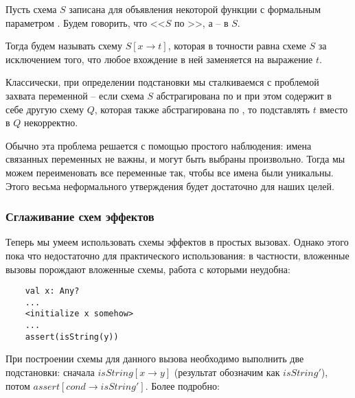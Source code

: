 \begin{definition}
     Пусть схема $S$ записана для объявления некоторой функции с формальным параметром . Будем говорить, что <<$S$  по >>, а  --  в $S$.
     
     Тогда  будем называть схему $S[x \to t]$, которая в точности равна схеме $S$ за исключением того, что любое вхождение  в ней заменяется на выражение $t$. 
\end{definition}

Классически, при определении подстановки мы сталкиваемся с проблемой захвата переменной -- если схема $S$ абстрагирована по  и при этом содержит в себе другую схему $Q$, которая также абстрагирована по , то подставлять $t$ вместо  в $Q$ некорректно. 

Обычно эта проблема решается с помощью простого наблюдения: имена связанных переменных не важны, и могут быть выбраны произвольно. Тогда мы можем переименовать все переменные так, чтобы все имена были уникальны. Этого весьма неформального утверждения будет достаточно для наших целей. 




\subsubsection{Сглаживание схем эффектов}

\label{section-flattening}

Теперь мы умеем использовать схемы эффектов в простых вызовах. Однако этого пока что недостаточно для практического использования: в частности, вложенные вызовы порождают вложенные схемы, работа с которыми неудобна:

\begin{verbatim}
    val x: Any?
    ...
    <initialize x somehow>
    ...
    assert(isString(y))
\end{verbatim}

При построении схемы для данного вызова необходимо выполнить две подстановки: сначала $isString[x \to y]$ (результат обозначим как $isString'$), потом $assert[cond \to isString']$. Более подробно:

\bigskip

 {
         \\
         \\
}{}

